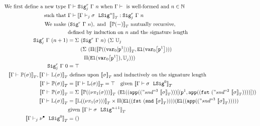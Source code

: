 \begin{align*}
  \text{We first define a new type }& \goodType{\Gamma}{\Sigr{\Gamma}{n}{j}}{}  \text{ when } \goodCtx{\Gamma}{}  \text{ is well-formed and } n \in \mathbb{N} \\
  \text{such that } &\goodTerm{\Gm}{\denotesT{\goodSigU{j}{\Gamma}{\lsig}{n}}}{\Sigr{\Gm}{n}{j}} \\
  \text{We make } & ({\Sigr{\Gamma}{n}{}}), \text{ and } \ \denotesT{\TyTkg {-}} \text{ mutually recursive, } \\
  & \text{defined by induction on $n$ and the signature length} \\  
  {\Sigr{\Gamma}{(n+1)}{j}} &= 
    \Sigma~(\Sigr{\Gamma}{n}{})
          ~(\Sigma~\cU_j \\
          & \quad \quad ~(\Sigma~(\TyPi{\denotesT{\TyTkg {(\var{0}[\SubstWeak{1}])}}}{\El{\sub{\var{0}}{\SubstWeak{1}}}}) \\
          & \quad \quad \quad \TyPi{\El{\sub{\var{0}}{\SubstWeak{1}}}}{\cU_j})) \\
  \Sigr{\Gamma}{0}{j} &= \top \\
  \denotesT{\goodType{\Gamma}{\TyTkg {\sigma}}{}}, \denotesT{\goodType{\Gamma}{\TyLkg{\sigma}}{}} &\text{ defines upon } \denotesT{\sigma} 
  \text{ and inductively on the signature length} \\
  \denotesT{\goodType{\Gamma}{\TyTkg {\sigma}}{}} &= \denotesT{\goodType{\Gamma}{\TyLkg{\sigma}}{}} = \top \quad
      \text{given } \denotesT{\goodSig{\Gamma}{\sigma}{0}} \\ 
  \denotesT{\goodType{\Gamma}{\TyTkg {\sigma}}{}} &= 
    \Sigma~\denotesT{\TyTkg {(\lsigproj{1}{\sigma})}}~(\El{(\app{("snd"^3~\denotesT{\sigma})})[(\SubstWeak{1}, \app{(\fst{("snd"^2~{\denotesT{\sigma}})})})]}) \\
  \denotesT{\goodType{\Gamma}{\TyLkg{\sigma}}{}} &=
  \denotesT{\TyLkg{(\lsigproj{1}{\sigma})}} \times \Pi(\El{(\fst{(\snd{\denotesT{\sigma}})})})(\El{(\app{("snd"^3~\denotesT{\sigma})} )}) \\
  &\text{given } \denotesT{\goodSig{\Gamma}{\sigma}{n+1}} \\
  \denotesT{\goodSigU{j}{\Gamma}{\LSigEmp}{0}} &= \unit \\ 

\end{align*}
